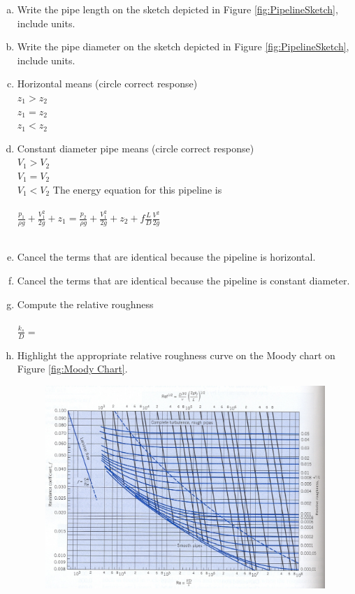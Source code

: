 \documentclass[12pt]{article}
\begin{document}
\begin{enumerate}[a)]
\item Write the pipe length on the sketch depicted in Figure \ref{fig:PipelineSketch}, include units.
\item Write the pipe diameter on the sketch depicted in Figure \ref{fig:PipelineSketch}, include units.
\item Horizontal means (circle correct response)\\
$z_1 > z_2$ \\
$z_1 = z_2$ \\
$z_1 < z_2$ 
\item Constant diameter pipe means (circle correct response)\\
$V_1 > V_2$ \\
$V_1 = V_2$ \\
$V_1 < V_2$ 
\newpage
The energy equation for this pipeline is\\~\\
$ \frac{p_1}{\rho g} + \frac{V_1^2}{2g} + z_1= \frac{p_2}{\rho g} + \frac{V_1^2}{2g} +z_2 + f\frac{L}{D}\frac{V^2}{2g}$\\~\\
\item Cancel the terms that are identical because the pipeline is horizontal.
\item Cancel the terms that are identical because the pipeline is constant diameter.
\item Compute the relative roughness \\~\\
\begin{math}
  \frac{k_s}{D} = 
\end{math} 
\\
\item Highlight the appropriate relative roughness curve on the Moody chart on Figure \ref{fig:Moody Chart}.
\begin{figure}[h!] %
\centering
   \includegraphics[width=6in]{Moody.jpg}

\end{figure}
\end{enumerate}
\end{document}
